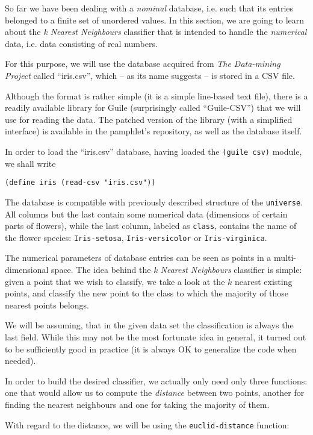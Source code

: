So far we have been dealing with a \textit{nominal} database,
i.e. such that its entries belonged to a finite set of
unordered values. In this section, we are going to learn
about the \textit{k Nearest Neighbours} classifier that
is intended to handle the \textit{numerical} data, i.e.
data consisting of real numbers.

For this purpose, we will use the database acquired from
\textit{The Data-mining Project} called ``iris.csv'', which
-- as its name suggests -- is stored in a CSV file.

Although the format is rather simple (it is a simple line-based
text file), there is a readily available library for Guile
(surprisingly called ``Guile-CSV'') that we will use for reading
the data. The patched version of the library (with a simplified
interface) is available in the pamphlet's repository, as well
as the database itself.

In order to load the ``iris.csv'' database, having loaded
the \texttt{(guile csv)} module, we shall write 

\texttt{(define iris (read-csv "iris.csv"))}

The database is compatible with previously described structure
of the \texttt{universe}. All columns but the last contain
some numerical data (dimensions of certain parts of flowers),
while the last column, labeled as \texttt{class}, contains
the name of the flower species: \texttt{Iris-setosa},
\texttt{Iris-versicolor} or \texttt{Iris-virginica}.

The numerical parameters of database entries can be seen
as points in a multi-dimensional space. The idea behind
the \textit{k Nearest Neighbours} classifier is simple:
given a point that we wish to classify, we take a look
at the $k$ nearest existing points, and classify the new
point to the class to which the majority of those nearest
points belongs.

We will be assuming, that in the given data set
the classification is always the last field. While
this may not be the most fortunate idea in general,
it turned out to be sufficiently good in practice
(it is always OK to generalize the code when needed).

In order to build the desired classifier, we actually
only need only three functions: one that would allow
us to compute the \textit{distance} between two points,
another for finding the nearest neighbours and one for
taking the majority of them.

With regard to the distance, we will be using the
\texttt{euclid-distance} function:

